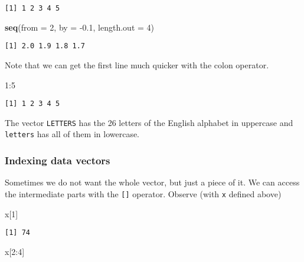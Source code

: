 \documentclass[]{book}
\newenvironment{Shaded}{\begin{snugshade}}{\end{snugshade}}
\newcommand{\KeywordTok}[1]{\textcolor[rgb]{0.13,0.29,0.53}{\textbf{{#1}}}}
\newcommand{\DataTypeTok}[1]{\textcolor[rgb]{0.13,0.29,0.53}{{#1}}}
\newcommand{\DecValTok}[1]{\textcolor[rgb]{0.00,0.00,0.81}{{#1}}}
\newcommand{\FloatTok}[1]{\textcolor[rgb]{0.00,0.00,0.81}{{#1}}}
\newcommand{\NormalTok}[1]{{#1}}
\numberwithin{equation}{chapter}
\numberwithin{figure}{chapter}
\theoremstyle{plain}
\theoremstyle{definition}
\theoremstyle{remark}
\theoremstyle{definition}
\theoremstyle{definition}
\theoremstyle{remark}
\begin{document}
\begin{verbatim}
[1] 1 2 3 4 5
\end{verbatim}

\begin{Shaded}
\begin{Highlighting}[]
\KeywordTok{seq}\NormalTok{(}\DataTypeTok{from =} \DecValTok{2}\NormalTok{, }\DataTypeTok{by =} \NormalTok{-}\FloatTok{0.1}\NormalTok{, }\DataTypeTok{length.out =} \DecValTok{4}\NormalTok{)}
\end{Highlighting}
\end{Shaded}

\begin{verbatim}
[1] 2.0 1.9 1.8 1.7
\end{verbatim}

Note that we can get the first line much quicker with the colon
operator.

\begin{Shaded}
\begin{Highlighting}[]
\DecValTok{1}\NormalTok{:}\DecValTok{5}
\end{Highlighting}
\end{Shaded}

\begin{verbatim}
[1] 1 2 3 4 5
\end{verbatim}

The vector \texttt{LETTERS}  has the 26
letters of the English alphabet in uppercase and \texttt{letters}
 has all of them in lowercase.

\subsubsection{Indexing data vectors}\label{indexing-data-vectors}

Sometimes we do not want the whole vector, but just a piece of it. We
can access the intermediate parts with the \texttt{{[}{]}} operator.
Observe (with \texttt{x} defined above)

\begin{Shaded}
\begin{Highlighting}[]
\NormalTok{x[}\DecValTok{1}\NormalTok{]}
\end{Highlighting}
\end{Shaded}

\begin{verbatim}
[1] 74
\end{verbatim}

\begin{Shaded}
\begin{Highlighting}[]
\NormalTok{x[}\DecValTok{2}\NormalTok{:}\DecValTok{4}\NormalTok{]}
\end{Highlighting}
\end{Shaded}
\end{document}
